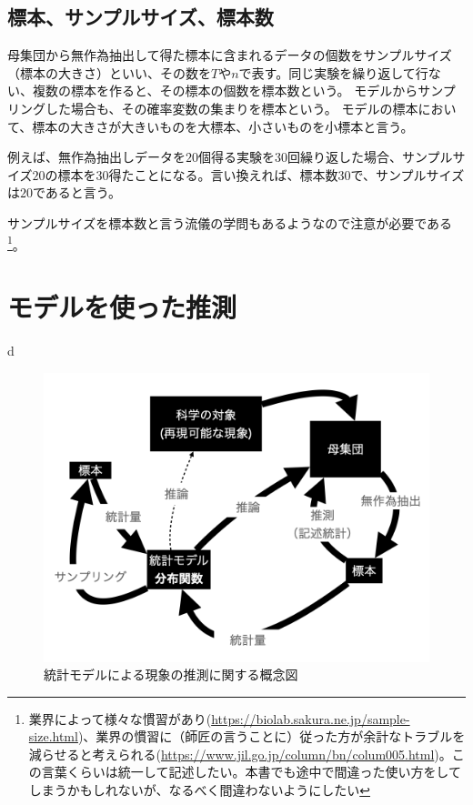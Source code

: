 \subsection{標本、サンプルサイズ、標本数}
\begin{defi}
母集団から無作為抽出して得た標本に含まれるデータの個数をサンプルサイズ（標本の大きさ）といい、その数を$T$や$n$で表す。同じ実験を繰り返して行ない、複数の標本を作ると、その標本の個数を標本数という。
モデルからサンプリングした場合も、その確率変数の集まりを標本という。
モデルの標本において、標本の大きさが大きいものを大標本、小さいものを小標本と言う。
\end{defi}
例えば、無作為抽出しデータを$20$個得る実験を30回繰り返した場合、サンプルサイズ$20$の標本を$30$得たことになる。言い換えれば、標本数$30$で、サンプルサイズは$20$であると言う。

サンプルサイズを標本数と言う流儀の学問もあるようなので注意が必要である
\footnote{業界によって様々な慣習があり(\url{https://biolab.sakura.ne.jp/sample-size.html})、業界の慣習に（師匠の言うことに）従った方が余計なトラブルを減らせると考えられる(\url{https://www.jil.go.jp/column/bn/colum005.html})。この言葉くらいは統一して記述したい。本書でも途中で間違った使い方をしてしまうかもしれないが、なるべく間違わないようにしたい}。


\section{モデルを使った推測}
d

\begin{figure}
    \begin{center}
        \includegraphics[width=15cm]{./image/01_/conceptual_diagram/conceptual_diagram.002.png}
        \caption{統計モデルによる現象の推測に関する概念図}
        \label{fig:conceptual_diagram_statistics}
    \end{center}
\end{figure}
    

